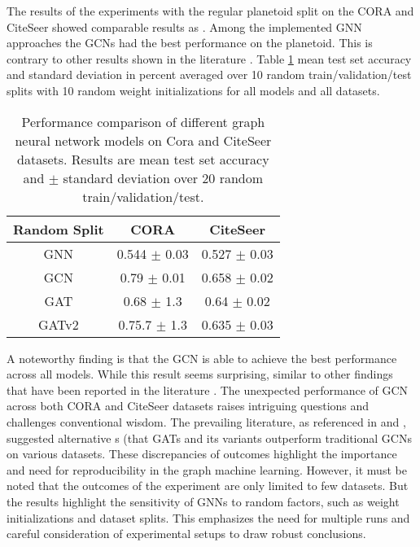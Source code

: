 \documentclass[runningheads]{llncs}
\begin{document}
\newpage
The results of the experiments with the regular planetoid split on the CORA and CiteSeer showed comparable results as \cite{Oleksandr}. Among the implemented GNN approaches the GCNs had the best performance on the planetoid. This is contrary to other results shown in the literature \cite{veličković2018graph}\cite{Brody2021}. Table \ref{table_1} mean test set accuracy and standard deviation in percent averaged over 10 random train/validation/test splits with 10 random weight initializations for all models and all datasets.

\begin{table}[h]
    \centering
    \begin{tabular}{||c c c ||} 
        \hline
         Random Split& CORA & CiteSeer  \\ [0.5ex] 
        \hline\hline
        GNN & 0.544 $\pm$ 0.03 & 0.527 $\pm$ 0.03  \\ 
        \hline
        GCN & 0.79 $\pm$ 0.01 & 0.658 $\pm$ 0.02 \\
        \hline
        GAT & 0.68 $\pm$ 1.3 & 0.64 $\pm$ 0.02\\
        \hline
        GATv2 & 0.75.7 $\pm$ 1.3 & 0.635 $\pm$ 0.03\\
        \hline
    \end{tabular}
    \caption{Performance comparison of different graph neural network models on Cora and CiteSeer datasets. Results are mean test set accuracy and $\pm$ standard deviation over 20 random train/validation/test.}
    \label{table_1}
\end{table}

 A noteworthy finding is that the  GCN is able to achieve the best performance across all models. While this result seems surprising, similar to other findings that have been reported in the literature \cite{Oleksandr}. The unexpected performance of GCN across both CORA and CiteSeer datasets raises intriguing questions and challenges conventional wisdom. The prevailing literature, as referenced in \cite{veličković2018graph} and \cite{Brody2021}, suggested alternative s (that GATs and its variants outperform traditional GCNs on various datasets. These discrepancies of outcomes highlight the importance and need for reproducibility in the graph machine learning. However, it must be noted that the outcomes of the experiment are only limited to few datasets. But the results highlight the sensitivity of GNNs to random factors, such as weight initializations and dataset splits. This emphasizes the need for multiple runs and careful consideration of experimental setups to draw robust conclusions.
\end{document}
